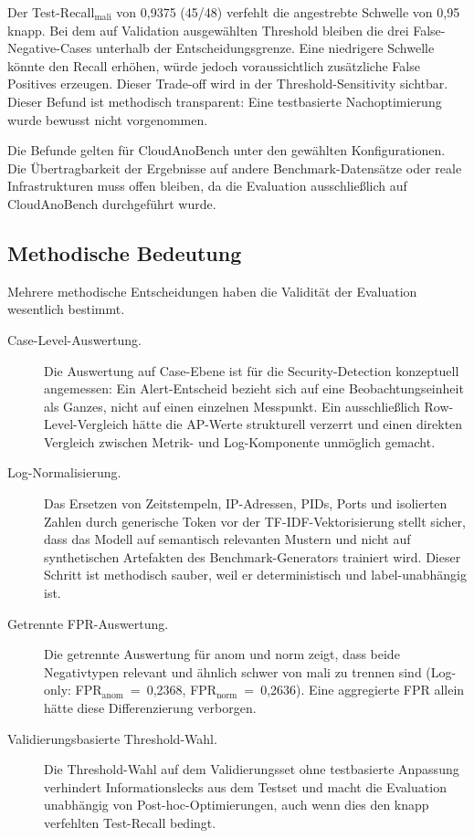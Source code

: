 Der Test-Recall$_{\text{mali}}$ von 0{,}9375 (45/48) verfehlt die
angestrebte Schwelle von 0{,}95 knapp. Bei dem auf Validation ausgewählten
Threshold bleiben die drei False-Negative-Cases unterhalb der Entscheidungs\-grenze.
Eine niedrigere Schwelle könnte den Recall erhöhen, würde jedoch voraussichtlich
zusätzliche False Positives erzeugen. Dieser Trade-off wird in der
Threshold-Sensitivity sichtbar. Dieser Befund ist methodisch transparent: Eine
testbasierte Nachoptimierung wurde bewusst nicht vorgenommen.

Die Befunde gelten für CloudAnoBench unter den gewählten Konfigurationen.
Die Übertragbarkeit der Ergebnisse auf andere Benchmark-Datensätze oder reale
Infrastrukturen muss offen bleiben, da die Evaluation ausschließlich auf
CloudAnoBench durchgeführt wurde.

\subsection{Methodische Bedeutung}

Mehrere methodische Entscheidungen haben die Validität der Evaluation
wesentlich bestimmt.

\begin{description}
  \item[Case-Level-Auswertung.] Die Auswertung auf Case-Ebene ist für die\hfil\break
    Security-Detection konzeptuell angemessen: Ein Alert-Entscheid bezieht sich
    auf eine Beobachtungseinheit als Ganzes, nicht auf einen einzelnen
    Messpunkt. Ein ausschließlich Row-Level-Vergleich hätte die AP-Werte
    strukturell verzerrt und einen direkten Vergleich zwischen Metrik- und
    Log-Komponente unmöglich gemacht.

  \item[Log-Normalisierung.] Das Ersetzen von Zeitstempeln, IP-Adressen,
    PIDs, Ports und isolierten Zahlen durch generische Token vor der
    TF-IDF-Vektorisierung stellt sicher, dass das Modell auf semantisch
    relevanten Mustern und nicht auf synthetischen Artefakten des
    Benchmark-Generators trainiert wird. Dieser Schritt ist methodisch sauber,
    weil er deterministisch und label-unabhängig ist.

  \item[Getrennte FPR-Auswertung.] Die getrennte Auswertung für anom und norm
    zeigt, dass beide Negativtypen relevant und ähnlich schwer von mali zu
    trennen sind (Log-only: FPR$_{\text{anom}}$~=~0{,}2368,
    FPR$_{\text{norm}}$~=~0{,}2636). Eine aggregierte FPR allein hätte diese
    Differenzierung verborgen.

  \item[Validierungsbasierte Threshold-Wahl.] Die Threshold-Wahl auf dem
    Validierungsset ohne testbasierte Anpassung verhindert Informationslecks
    aus dem Testset und macht die Evaluation unabhängig von
    Post-hoc-Optimierungen, auch wenn dies den knapp verfehlten Test-Recall
    bedingt.
\end{description}

